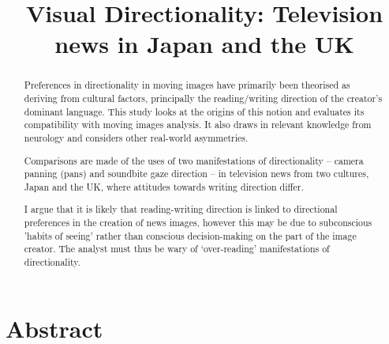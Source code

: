 \documentclass[11pt, oneside, a4paper]{scrartcl}
\title{Visual Directionality: Television news in Japan and the UK}
\author{}
\date{}
\begin{document}


\maketitle

\thispagestyle{empty}
\section*{Abstract}
\begin{abstract} Preferences in directionality in moving images have primarily been theorised as deriving from cultural factors, principally the reading/writing direction of the creator's dominant language. This study looks at the origins of this notion and evaluates its compatibility with moving images analysis. It also draws in relevant knowledge from neurology and considers other real-world asymmetries.

Comparisons are made of the uses of two manifestations of directionality -- camera panning (pans) and soundbite gaze direction -- in television news from two cultures, Japan and the UK, where attitudes towards writing direction differ. 

I argue that it is likely that reading-writing direction is linked to directional preferences in the creation of news images, however this may be due to subconscious 'habits of seeing' rather than conscious decision-making on the part of the image creator. The analyst must thus be wary of `over-reading' manifestations of directionality.
\end{abstract}
\end{document}
